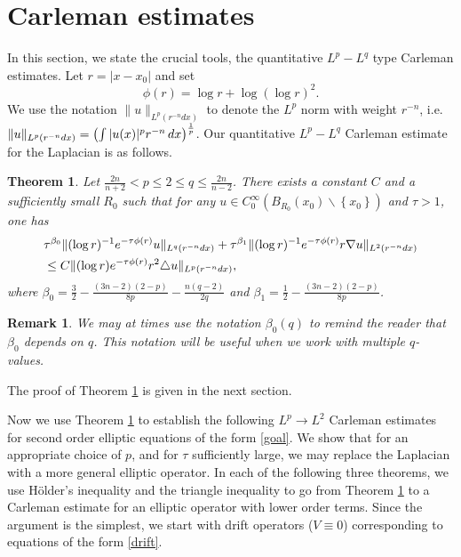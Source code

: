\documentclass[11pt]{amsart}
\theoremstyle{plain}
\newtheorem{remark}{Remark}
\newtheorem{theorem}{Theorem}
\numberwithin{equation}{section}
\begin{document}
\section{Carleman estimates }
\label{CarlEst}

In this section, we state the crucial tools, the quantitative $L^p-L^{ q}$ type Carleman estimates.
Let $r=|x-x_0|$ and set
$$\phi(r)=\log r+\log(\log r)^2.$$
We use the notation $\|u\|_{L^p(r^{-n} dx)}$ to denote the $L^p$ norm with weight $r^{-n}$, i.e. $\|u\|_{L^p(r^{-n} dx)} = {\displaystyle} {\left( {\int |u{\left( {x} \right) }|^p r^{-n}\, dx} \right) }^\frac{1}{p}$.
Our quantitative $L^p - L^q$ Carleman estimate for the Laplacian is as follows.

\begin{theorem}
Let $\frac{2n}{n+2} < p \le 2 \leq q \leq \frac{2n}{n-2}$. There
exists a constant $C$ and a sufficiently small $R_0$ such that for any
$u\in C^{\infty}_{0}{\left( {B_{R_0}(x_0)\backslash{\left\{{x_0}\right\}} } \right) }$ and
$\tau>1$, one has
\begin{align}
&\tau^{{\beta}_0} \|(\log r)^{-1} e^{-\tau \phi(r)}u\|_{L^q(r^{-n}dx)} +
\tau^{{\beta}_1} \|(\log r )^{-1} e^{-\tau \phi(r)}r \nabla
u\|_{L^2(r^{-n}dx)}
\nonumber \medskip\\
&\leq  C \|(\log r ) e^{-\tau \phi(r)} r^2 \triangle u\|_{L^p(r^{-n} dx)} ,
\label{mainCar}
\end{align}
where ${\beta}_0 = \frac 3 2 -
\frac{{\left( {3n-2} \right) }{\left( {2-p} \right) }}{8p}-\frac{n(q-2)}{2q}$ and ${\beta}_1 =
\frac{1}{2}-\frac{{\left( {3n-2} \right) }{\left( {2-p} \right) }}{8p}$.
 \label{Carlpq}
\end{theorem}

\begin{remark}
We may at times use the notation ${\beta}_0{\left( {q} \right) }$ to remind the reader that ${\beta}_0$ depends on $q$.
This notation will be useful when we work with multiple $q$-values.
\end{remark}

The proof of Theorem \ref{Carlpq} is given in the next section.

Now we use Theorem \ref{Carlpq} to establish the following $L^p\to L^2$ Carleman estimates for second order elliptic equations of the form \eqref{goal}.
We show that for an appropriate choice of $p$, and for $\tau$ sufficiently large, we may replace the Laplacian with a more general elliptic operator.
In each of the following three theorems, we use H\"older's inequality and the triangle inequality to go from Theorem \ref{Carlpq} to a Carleman estimate for an elliptic operator with lower order terms.
Since the argument is the simplest, we start with drift operators ($V \equiv 0$) corresponding to equations of the form \eqref{drift}.
\end{document}
